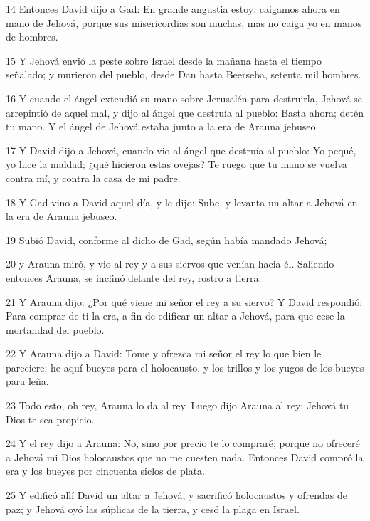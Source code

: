 \par 14 Entonces David dijo a Gad: En grande angustia estoy; caigamos ahora en mano de Jehová, porque sus misericordias son muchas, mas no caiga yo en manos de hombres.
\par 15 Y Jehová envió la peste sobre Israel desde la mañana hasta el tiempo señalado; y murieron del pueblo, desde Dan hasta Beerseba, setenta mil hombres.
\par 16 Y cuando el ángel extendió su mano sobre Jerusalén para destruirla, Jehová se arrepintió de aquel mal, y dijo al ángel que destruía al pueblo: Basta ahora; detén tu mano. Y el ángel de Jehová estaba junto a la era de Arauna jebuseo. 
\par 17 Y David dijo a Jehová, cuando vio al ángel que destruía al pueblo: Yo pequé, yo hice la maldad; ¿qué hicieron estas ovejas? Te ruego que tu mano se vuelva contra mí, y contra la casa de mi padre.
\par 18 Y Gad vino a David aquel día, y le dijo: Sube, y levanta un altar a Jehová en la era de Arauna jebuseo.
\par 19 Subió David, conforme al dicho de Gad, según había mandado Jehová;
\par 20 y Arauna miró, y vio al rey y a sus siervos que venían hacia él. Saliendo entonces Arauna, se inclinó delante del rey, rostro a tierra.
\par 21 Y Arauna dijo: ¿Por qué viene mi señor el rey a su siervo? Y David respondió: Para comprar de ti la era, a fin de edificar un altar a Jehová, para que cese la mortandad del pueblo.
\par 22 Y Arauna dijo a David: Tome y ofrezca mi señor el rey lo que bien le pareciere; he aquí bueyes para el holocausto, y los trillos y los yugos de los bueyes para leña. 
\par 23 Todo esto, oh rey, Arauna lo da al rey. Luego dijo Arauna al rey: Jehová tu Dios te sea propicio.
\par 24 Y el rey dijo a Arauna: No, sino por precio te lo compraré; porque no ofreceré a Jehová mi Dios holocaustos que no me cuesten nada. Entonces David compró la era y los bueyes por cincuenta siclos de plata.
\par 25 Y edificó allí David un altar a Jehová, y sacrificó holocaustos y ofrendas de paz; y Jehová oyó las súplicas de la tierra, y cesó la plaga en Israel.

